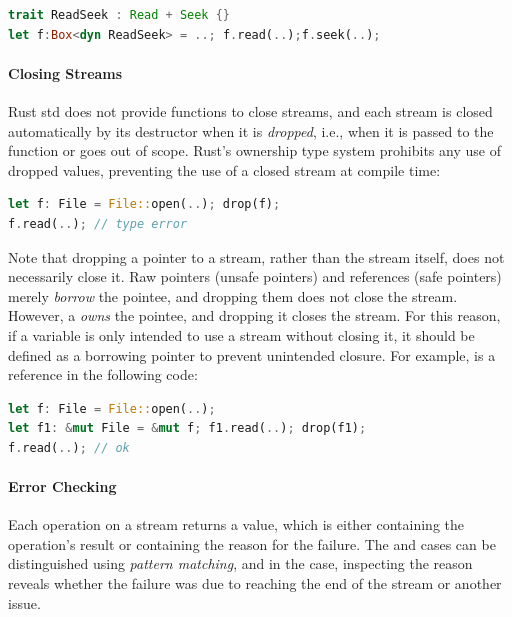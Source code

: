 \begin{lstlisting}[language=Rust]
trait ReadSeek : Read + Seek {}
let f:Box<dyn ReadSeek> = ..; f.read(..);f.seek(..);
\end{lstlisting}

\paragraph{Closing Streams}

Rust std does not provide functions to close streams, and each stream is closed
automatically by its destructor when it is \emph{dropped}, i.e., when it is
passed to the  function or goes out of scope.
%
Rust's ownership type system prohibits any use of dropped values, preventing the
use of a closed stream at compile time:

\begin{lstlisting}[language=Rust]
let f: File = File::open(..); drop(f);
f.read(..); // type error
\end{lstlisting}

Note that dropping a pointer to a stream, rather than the stream itself, does
not necessarily close it.
%
Raw pointers (unsafe pointers) and references (safe pointers) merely
\emph{borrow} the pointee, and dropping them does not close the stream.
%
However, a  \emph{owns} the pointee, and dropping it closes the stream.
%
For this reason, if a variable is only intended to use a stream without closing
it, it should be defined as a borrowing pointer to prevent unintended closure.
%
For example,  is a reference in the following code:

\begin{lstlisting}[language=Rust]
let f: File = File::open(..);
let f1: &mut File = &mut f; f1.read(..); drop(f1);
f.read(..); // ok
\end{lstlisting}

\paragraph{Error Checking}

Each operation on a stream returns a  value, which is either 
containing the operation's result or  containing the reason for the
failure.
%
The  and  cases can be distinguished using \emph{pattern matching},
and in the  case, inspecting the reason reveals whether the failure was
due to reaching the end of the stream or another issue.
